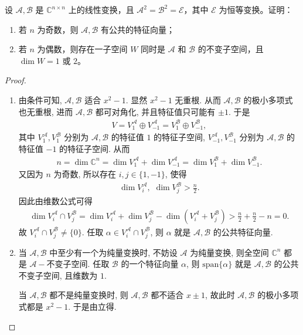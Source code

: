\documentclass[../../main.tex]{subfiles}%
\begin{document}
\begin{example}
设 \( \mathscr{A},\mathscr{B} \) 是 \( \mathbb{C}^{n \times n} \) 上的线性变换，且 \( \mathscr{A}^2 = \mathscr{B}^2 = \mathscr{E} \)，其中 \( \mathscr{E} \) 为恒等变换。证明：
\begin{enumerate}[(1)]
\item 若 \( n \) 为奇数，则 \( \mathscr{A},\mathscr{B} \) 有公共的特征向量；

\item 若 \( n \) 为偶数，则存在一子空间 \( W \) 同时是 \( \mathscr{A} \) 和 \( \mathscr{B} \) 的不变子空间，且 \( \dim W = 1 \) 或 \( 2 \)。
\end{enumerate}
\end{example}
\begin{proof}
\begin{enumerate}[(1)]
\item 由条件可知, $\mathscr{A},\mathscr{B}$ 适合 $x^2-1$. 显然 $x^2-1$ 无重根. 从而 $\mathscr{A},\mathscr{B}$ 的极小多项式也无重根,
进而 $\mathscr{A},\mathscr{B}$ 都可对角化, 并且特征值只可能有 $\pm 1$. 于是
\begin{align*}
V=V_{1}^{\mathscr{A}}\oplus V_{-1}^{\mathscr{A}}=V_{1}^{\mathscr{B}}\oplus V_{-1}^{\mathscr{B}},
\end{align*}
其中 $V_{1}^{\mathscr{A}},V_{1}^{\mathscr{B}}$ 分别为 $\mathscr{A},\mathscr{B}$ 的特征值 $1$ 的特征子空间, $V_{-1}^{\mathscr{A}},V_{-1}^{\mathscr{B}}$ 分别为 $\mathscr{A},\mathscr{B}$ 的特征值 $-1$ 的特征子空间. 从而
\begin{align*}
n=\dim\mathbb{C} ^n=\dim V_{1}^{\mathscr{A}}+\dim V_{-1}^{\mathscr{A}}=\dim V_{1}^{\mathscr{B}}+\dim V_{-1}^{\mathscr{B}}.
\end{align*}
又因为 $n$ 为奇数, 所以存在 $i,j\in \{ 1,-1 \}$, 使得
\begin{align*}
\dim V_{i}^{\mathscr{A}},\,\,\dim V_{j}^{\mathscr{B}}>\frac{n}{2}.
\end{align*}
因此由维数公式可得
\begin{align*}
\dim V_{i}^{\mathscr{A}}\cap V_{j}^{\mathscr{B}}=\dim V_{i}^{\mathscr{A}}+\dim V_{j}^{\mathscr{B}}-\dim\left( V_{i}^{\mathscr{A}}+V_{j}^{\mathscr{B}} \right) >\frac{n}{2}+\frac{n}{2}-n=0.
\end{align*}
故 $V_{i}^{\mathscr{A}}\cap V_{j}^{\mathscr{B}}\ne \{ 0 \}$. 任取 $\alpha \in V_{i}^{\mathscr{A}}\cap V_{j}^{\mathscr{B}}$, 则 $\alpha$ 就是 $\mathscr{A},\mathscr{B}$ 的公共特征向量.

\item 当 $\mathscr{A},\mathscr{B}$ 中至少有一个为纯量变换时, 不妨设 $\mathscr{A}$ 为纯量变换, 则全空间 $\mathbb{C} ^n$ 都是 $\mathscr{A}-$不变子空间. 任取 $\mathscr{B}$ 的一个特征向量 $\alpha$, 则 $\mathrm{span}\{ \alpha \}$ 就是 $\mathscr{A},\mathscr{B}$ 的公共不变子空间, 且维数为 $1$.

当 $\mathscr{A},\mathscr{B}$ 都不是纯量变换时, 则 $\mathscr{A},\mathscr{B}$ 都不适合 $x\pm 1$, 故此时 $\mathscr{A},\mathscr{B}$ 的极小多项式都是 $x^2-1$. 于是由立得.
\end{enumerate}
\end{proof}
\end{document}
